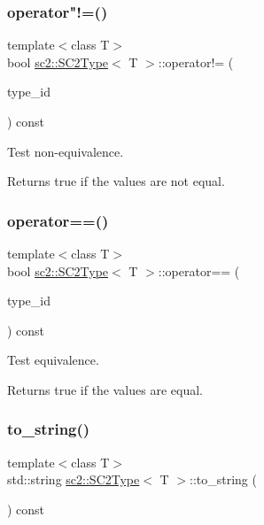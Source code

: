 \subsubsection{\texorpdfstring{operator"!=()}{operator!=()}}
{\footnotesize\ttfamily template$<$class T$>$ \\
bool \hyperlink{classsc2_1_1_s_c2_type}{sc2\+::\+S\+C2\+Type}$<$ T $>$\+::operator!= (\begin{DoxyParamCaption}\item[{\hyperlink{classsc2_1_1_s_c2_type}{S\+C2\+Type}$<$ T $>$}]{type\+\_\+id }\end{DoxyParamCaption}) const\hspace{0.3cm}{\ttfamily [inline]}}

Test non-\/equivalence. \begin{DoxyReturn}{Returns}
\textquotesingle{}true\textquotesingle{} if the values are not equal. 
\end{DoxyReturn}
\mbox{\label{classsc2_1_1_s_c2_type_a499b06e107c0561ce3d2d80094fbdd94}} 
\subsubsection{\texorpdfstring{operator==()}{operator==()}}
{\footnotesize\ttfamily template$<$class T$>$ \\
bool \hyperlink{classsc2_1_1_s_c2_type}{sc2\+::\+S\+C2\+Type}$<$ T $>$\+::operator== (\begin{DoxyParamCaption}\item[{\hyperlink{classsc2_1_1_s_c2_type}{S\+C2\+Type}$<$ T $>$}]{type\+\_\+id }\end{DoxyParamCaption}) const\hspace{0.3cm}{\ttfamily [inline]}}

Test equivalence. \begin{DoxyReturn}{Returns}
\textquotesingle{}true\textquotesingle{} if the values are equal. 
\end{DoxyReturn}
\mbox{\label{classsc2_1_1_s_c2_type_a25533b72e301be4064d80a13c82dc506}} 
\subsubsection{\texorpdfstring{to\+\_\+string()}{to\_string()}}
{\footnotesize\ttfamily template$<$class T$>$ \\
std\+::string \hyperlink{classsc2_1_1_s_c2_type}{sc2\+::\+S\+C2\+Type}$<$ T $>$\+::to\+\_\+string (\begin{DoxyParamCaption}{ }\end{DoxyParamCaption}) const\hspace{0.3cm}{\ttfamily [inline]}}

